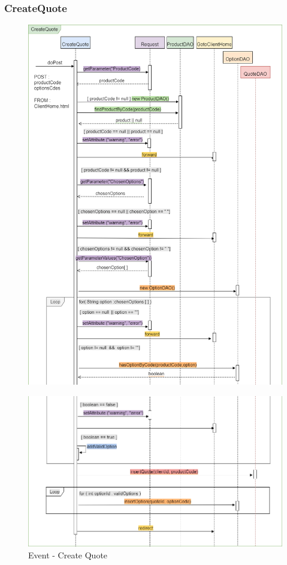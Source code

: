 \documentclass[a4paper, 12pt]{article}
\begin{document}
\subsubsection{CreateQuote}
\begin{figure}[h!]
	\centering
	\includegraphics[width=1\textwidth]{PureHTML_images/CreateQuote1.png}
	\label{figure:createquote1_sd}
\end{figure}
\newpage
\begin{figure}[h!]
	\centering
	\includegraphics[width=1\textwidth]{PureHTML_images/CreateQuote2.png}
	\caption{Event - Create Quote}
	\label{figure:createquote2_sd}
\end{figure}
\newpage
\end{document}
